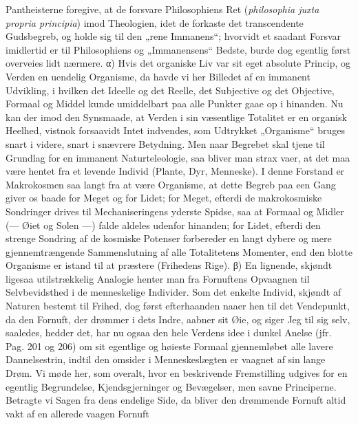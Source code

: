 \documentclass[12pt]{book}
\newcommand{\opage}[1]{\marginnote{\footnotesize\textit{[#1]}}}
\begin{document}
Pantheisterne foregive, at de forsvare Philosophiens Ret
(\textit{philosophia juxta propria principia}) imod Theologien, idet
\opage{233} de forkaste det transcendente Gudsbegreb, og holde sig til den
„rene Immanens“; hvorvidt et saadant Forsvar imidlertid er til
Philosophiens og „Immanensens“ Bedste, burde dog egentlig først
overveies lidt nærmere. α) Hvis det organiske Liv var sit eget
absolute Princip, og Verden en uendelig Organisme, da havde vi her
Billedet af en immanent Udvikling, i hvilken det Ideelle og det
Reelle, det Subjective og det Objective, Formaal og Middel kunde
umiddelbart paa alle Punkter gaae op i hinanden. Nu kan der imod
den Synsmaade, at Verden i sin væsentlige Totalitet er en organisk
Heelhed, vistnok forsaavidt Intet indvendes, som Udtrykket
„Organisme“ bruges snart i videre, snart i snævrere Betydning. Men
naar Begrebet skal tjene til Grundlag for en immanent
Naturteleologie, saa bliver man strax vaer, at det maa være hentet
fra et levende Individ (Plante, Dyr, Menneske). I denne Forstand er
Makrokosmen saa langt fra at være Organisme, at dette Begreb paa
een Gang giver os baade for Meget og for Lidet; for Meget, efterdi
de makrokosmiske Sondringer drives til Mechaniseringens yderste
Spidse, saa at Formaal og Midler (--- Øiet og Solen ---) falde
aldeles udenfor hinanden; for Lidet, efterdi den strenge Sondring
af de kosmiske Potenser forbereder en langt dybere og mere
gjennemtrængende Sammenslutning af alle Totalitetens Momenter, end
den blotte Organisme er istand til at præstere (Frihedens Rige). β)
En lignende, skjøndt ligesaa utilstrækkelig Analogie henter man fra
Fornuftens Opvaagnen til Selvbevidsthed i de menneskelige
Individer. Som det enkelte Individ, skjøndt af Naturen bestemt til
Frihed, dog først efterhaanden naaer hen til det Vendepunkt, da den
Fornuft, der drømmer i dets Indre, aabner sit Øie, og siger Jeg til
sig selv, saaledes, hedder det, har nu ogsaa den hele Verdens%
\opage{234}idee i dunkel Anelse (jfr. Pag. 201 og 206) om sit egentlige og
høieste Formaal gjennemløbet alle lavere Dannelsestrin, indtil den
omsider i Menneskeslægten er vaagnet af sin lange Drøm. Vi møde
her, som overalt, hvor en beskrivende Fremstilling udgives for en
egentlig Begrundelse, Kjendsgjerninger og Bevægelser, men savne
Principerne. Betragte vi Sagen fra dens endelige Side, da bliver
den drømmende Fornuft altid vakt af en allerede vaagen Fornuft
\end{document}
